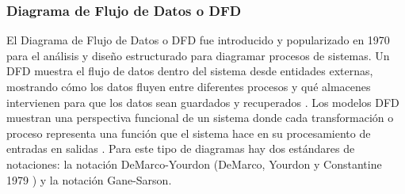\subsubsection{Diagrama de Flujo de Datos o DFD}

El Diagrama de Flujo de Datos o DFD fue introducido y popularizado en 1970 para el análisis y diseño estructurado \cite{Gane-Sarson-1979} para diagramar procesos de sistemas. Un DFD muestra el flujo de datos dentro del sistema desde entidades externas, mostrando cómo los datos fluyen entre diferentes procesos y qué almacenes intervienen para que los datos sean guardados y recuperados \cite{Scott-Ambler-2004}. Los modelos DFD muestran una perspectiva funcional de un sistema donde cada transformación o proceso representa una función que el sistema hace en su procesamiento de entradas en salidas \cite{Sommerville-2006}.\newline
Para este tipo de diagramas hay dos estándares de notaciones: la notación DeMarco-Yourdon (DeMarco, Yourdon y Constantine 1979 \cite{Dixit-2007}) y la notación Gane-Sarson.\newline
\newline

